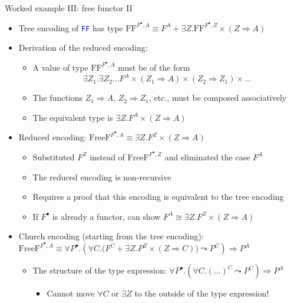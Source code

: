\documentclass[english,,russian]{beamer}
\begin{document}
\begin{frame}{Worked example III: free functor II}
\begin{itemize}
\item Tree encoding of \texttt{\textcolor{blue}{\footnotesize{}FF}} has
type $\text{FF}^{F^{\bullet},A}\equiv F^{A}+\exists Z.\text{FF}^{F^{\bullet},Z}\times\left(Z\Rightarrow A\right)$
\item Derivation of the reduced encoding:
\begin{itemize}
\item A value of type $\text{FF}^{F^{\bullet},A}$ must be of the form 
\[
\exists Z_{1}.\exists Z_{2}...F^{A}\times\left(Z_{1}\Rightarrow A\right)\times\left(Z_{2}\Rightarrow Z_{1}\right)\times...
\]
\item The functions $Z_{1}\Rightarrow A$, $Z_{2}\Rightarrow Z_{1}$, etc.,
must be composed associatively
\item The equivalent type is $\exists Z.F^{A}\times\left(Z\Rightarrow A\right)$
\end{itemize}
\item Reduced encoding: $\text{FreeF}^{F^{\bullet},A}\equiv\exists Z.F^{Z}\times\left(Z\Rightarrow A\right)$
\begin{itemize}
\item Substituted $F^{Z}$ instead of $\text{FreeF}^{F^{\bullet},Z}$ and
eliminated the case $F^{A}$
\item The reduced encoding is non-recursive
\item Requires a proof that this encoding is equivalent to the tree encoding
\item If $F^{\bullet}$ is already a functor, can show $F^{A}\cong\exists Z.F^{Z}\times\left(Z\Rightarrow A\right)$
\end{itemize}
\item Church encoding (starting from the tree encoding): $\text{FreeF}^{F^{\bullet},A}\equiv\forall P^{\bullet}.\left(\forall C.\big(F^{C}+\exists Z.P^{Z}\times\left(Z\Rightarrow C\right)\big)\leadsto P^{C}\right)\Rightarrow P^{A}$
\begin{itemize}
\item The structure of the type expression: $\forall P^{\bullet}.\left(\forall C.(...)^{C}\leadsto P^{C}\right)\Rightarrow P^{A}$
\begin{itemize}
\item Cannot move $\forall C$ or $\exists Z$ to the outside of the type
expression!
\end{itemize}
\end{itemize}
\end{itemize}
\end{frame}
\end{document}
